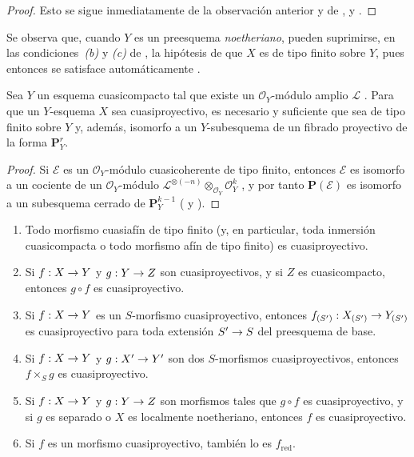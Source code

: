 \documentclass[oneside,10pt]{amsart}
\makeatletter
\newcommand{\ega@arrow}[2]{\mathchoice{#1}{#2}{#2}{#2}}
\renewcommand{\to}{\ega@arrow{\longrightarrow}{\rightarrow}}
\newcommand{\oldpage}[2][]{\marginnote{\normalfont\footnotesize\textbf{#1}~|~#2}\ignorespaces}
\let\EGAOriginalLabel\label
\renewcommand{\label}[1]{\phantomsection\EGAOriginalLabel{#1}}
\makeatother
\begin{document}
\begin{proof}
Esto se sigue inmediatamente de la observación anterior y de ,  y .
\end{proof}

Se observa que, cuando $Y$ es un preesquema \emph{noetheriano}, pueden suprimirse, en las condiciones~\emph{(b)} y \emph{(c)} de , la hipótesis de que $X$ es de tipo finito sobre $Y$, pues entonces se satisface automáticamente .

\begin{corollary}[5.3.3]
\label{II.5.3.3-fr}
Sea $Y$ un esquema cuasicompacto tal que existe un $\mathcal{O}_Y$-módulo amplio $\mathcal{L}$ .
Para que un $Y$-esquema $X$ sea cuasiproyectivo, es necesario y suficiente que sea de tipo finito sobre $Y$ y, además, isomorfo a un $Y$-subesquema de un fibrado proyectivo de la forma $\mathbf{P}_Y^r$.
\end{corollary}

\begin{proof}
Si $\mathcal{E}$ es un $\mathcal{O}_Y$-módulo cuasicoherente de tipo finito, entonces $\mathcal{E}$ es isomorfo a un cociente de un $\mathcal{O}_Y$-módulo $\mathcal{L}^{\otimes(-n)}\otimes_{\mathcal{O}_Y}\mathcal{O}_Y^k$ , y por tanto $\mathbf{P}(\mathcal{E})$ es isomorfo a un subesquema cerrado de $\mathbf{P}_Y^{k-1}$ ( y ).
\end{proof}

\begin{proposition}[5.3.4]
\label{II.5.3.4-fr}
\medskip\noindent
\begin{enumerate}
  \item[{\rm(i)}] Todo morfismo cuasiafín de tipo finito (y, en particular, toda inmersión cuasicompacta o todo morfismo afín de tipo finito) es cuasiproyectivo.
  \item[{\rm(ii)}] Si $f:X\to Y$ y $g:Y\to Z$ son cuasiproyectivos, y si $Z$ es cuasicompacto, entonces $g\circ f$ es cuasiproyectivo.
\oldpage[II]{100}
  \item[{\rm(iii)}] Si $f:X\to Y$ es un $S$-morfismo cuasiproyectivo, entonces $f_{(S')}:X_{(S')}\to Y_{(S')}$ es cuasiproyectivo para toda extensión $S'\to S$ del preesquema de base.
  \item[{\rm(iv)}] Si $f:X\to Y$ y $g:X'\to Y'$ son dos $S$-morfismos cuasiproyectivos, entonces $f\times_Sg$ es cuasiproyectivo.
  \item[{\rm(v)}] Si $f:X\to Y$ y $g:Y\to Z$ son morfismos tales que $g\circ f$ es cuasiproyectivo, y si $g$ es separado o $X$ es localmente noetheriano, entonces $f$ es cuasiproyectivo.
  \item[{\rm(vi)}] Si $f$ es un morfismo cuasiproyectivo, también lo es $f_{\mathrm{red}}$.
\end{enumerate}
\end{proposition}
\end{document}
